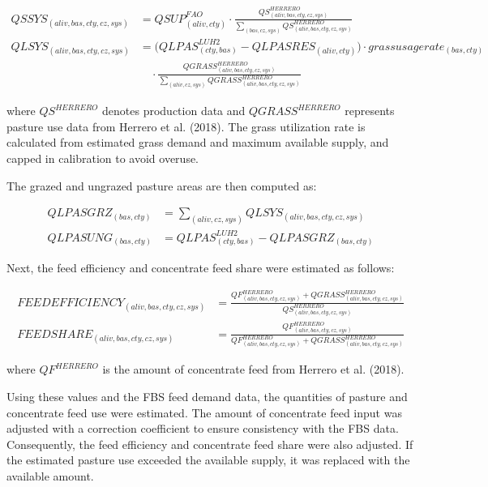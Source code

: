 \begin{align}
QSSYS_{(aliv,bas,cty,cz,sys)} &= 
QSUP^{FAO}_{(aliv,cty)} \cdot 
\frac{QS^{HERRERO}_{(aliv,bas,cty,cz,sys)}}
{\sum_{(bas,cz,sys)} QS^{HERRERO}_{(aliv,bas,cty,cz,sys)}} \\
QLSYS_{(aliv,bas,cty,cz,sys)} &= 
\big(QLPAS^{LUH2}_{(cty,bas)} - QLPASRES_{(aliv,cty)}\big)
  \cdot grassusagerate_{(bas,cty)}
\nonumber\\[-0.3em]
  &\quad
\cdot 
\frac{QGRASS^{HERRERO}_{(aliv,bas,cty,cz,sys)}}
{\sum_{(aliv,cz,sys)} QGRASS^{HERRERO}_{(aliv,bas,cty,cz,sys)}}
\end{align}

where \( QS^{HERRERO} \) denotes production data 
and \( QGRASS^{HERRERO} \) represents pasture use data 
from Herrero et al. (2018). The grass utilization rate is calculated from
estimated grass demand and maximum available supply, and capped in calibration
to avoid overuse.

The grazed and ungrazed pasture areas are then computed as:

\begin{align}
QLPASGRZ_{(bas,cty)} &= \sum_{(aliv,cz,sys)} QLSYS_{(aliv,bas,cty,cz,sys)} \\
QLPASUNG_{(bas,cty)} &= QLPAS^{LUH2}_{(cty,bas)} - QLPASGRZ_{(bas,cty)}
\end{align}

Next, the feed efficiency and concentrate feed share were estimated as follows:

\begin{align}
FEEDEFFICIENCY_{(aliv,bas,cty,cz,sys)} &= 
\frac{QF^{HERRERO}_{(aliv,bas,cty,cz,sys)} + QGRASS^{HERRERO}_{(aliv,bas,cty,cz,sys)}}
{QS^{HERRERO}_{(aliv,bas,cty,cz,sys)}} \\
FEEDSHARE_{(aliv,bas,cty,cz,sys)} &= 
\frac{QF^{HERRERO}_{(aliv,bas,cty,cz,sys)}}
{QF^{HERRERO}_{(aliv,bas,cty,cz,sys)} + QGRASS^{HERRERO}_{(aliv,bas,cty,cz,sys)}}
\end{align}

where \( QF^{HERRERO} \) is the amount of concentrate feed from Herrero et al. (2018).

Using these values and the FBS feed demand data, 
the quantities of pasture and concentrate feed use were estimated. 
The amount of concentrate feed input was adjusted with a correction coefficient 
to ensure consistency with the FBS data. 
Consequently, the feed efficiency and concentrate feed share were also adjusted. 
If the estimated pasture use exceeded the available supply, 
it was replaced with the available amount.

